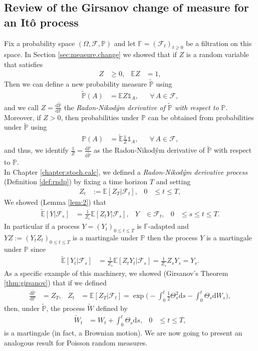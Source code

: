 \documentclass[12pt]{book}
\numberwithin{equation}{chapter}
\theoremstyle{plain}
\numberwithin{theorem}{section}
\theoremstyle{definition}
\numberwithin{exercise}{chapter}
\newcommand{\<}{\langle}
\renewcommand{\>}{\rangle}
\renewcommand{\(}{\left(}
\renewcommand{\)}{\right)}
\renewcommand{\[}{\left[}
\renewcommand{\]}{\right]}
\newcommand\Eb{\mathds{E}}
\newcommand\Fb{\mathds{F}}
\newcommand\Ib{\mathds{1}} 	%
\newcommand\Pb{\mathds{P}}
\newcommand\Fc{\mathscr{F}}
\newcommand\Om{\Omega}
\newcommand\Ebt{\widetilde{\Eb}}
\newcommand\Pbt{\widetilde{\Pb}}
\newcommand\Wt{\widetilde{W}}
\newcommand\dd{\mathrm{d}}
\begin{document}
\subsection*{Review of the Girsanov change of measure for an It\^o process}
Fix a probability space $(\Om,\Fc,\Pb)$ and let $\Fb=(\Fc_t)_{t \geq 0}$ be a filtration on this space.  In Section \ref{sec:measure.change} we showed that if $Z$ is a random variable that satisfies
\begin{align}
Z
	&\geq 0 , &
\Eb Z
	&=	1 ,
\end{align}
Then we can define a new probability measure $\Pbt$ using
\begin{align}
\Pbt(A)
	&=	\Eb Z \Ib_A , &
	&\forall \, A \in \Fc ,
\end{align}
and we call $Z = \frac{\dd \Pbt}{\dd \Pb}$ the \emph{Radon-Nikod\'ym derivative of $\Pbt$ with respect to $\Pb$}.  Moreover, if $Z>0$, then probabilities under $\Pb$ can be obtained from probabilities under $\Pbt$ using
\begin{align}
\Pb(A)
	&=	\Ebt \frac{1}{Z} \Ib_A , &
	&\forall \, A \in \Fc ,
\end{align}
and thus, we identify $\frac{1}{Z} = \frac{\dd \Pb}{\dd \Pbt}$ as the Radon-Nikod\'ym derivative of $\Pbt$ with respect to $\Pb$.
\\[0.5em]
In Chapter \ref{chapter:stoch.calc}, we defined a \emph{Radon-Nikod\'ym derivative process} (Definition \ref{def:rndp}) by fixing a time horizon $T$ and setting
\begin{align}
Z_t
	&:=	\Eb[ Z_T | \Fc_t ] , &
0
	&\leq t \leq T ,
\end{align}
We showed (Lemma \ref{lem:2}) that 
\begin{align}
\Ebt[ Y | \Fc_s ]
	&=	\frac{1}{Z_s} \Eb[ Z_t Y | \Fc_s ] , &
Y
	&\in \Fc_t , &
0
	&\leq s \leq t \leq T .
\end{align}
In particular if a process $Y = (Y_t)_{0 \leq t \leq T}$ is $\Fb$-adapted and $Y Z := (Y_t Z_t)_{0 \leq t \leq T}$ is a martingale under $\Pb$ then the process $Y$ is a martingale under $\Pb$ since
\begin{align}
\Ebt[ Y_t | \Fc_s ]
	&=	\frac{1}{Z_s} \Eb[ Z_t Y_t | \Fc_s ] 
	=	\frac{1}{Z_s} Z_s Y_s 
	=	Y_s . \label{eq:Etilde.martingale}
\end{align}
As a specific example of this machinery, we showed (Girsanov's Theorem \ref{thm:girsanov}) that if we defined
\begin{align}
\frac{\dd \Pbt}{\dd \Pb} 
	&= Z_T , &
Z_t
	&=	\Eb[Z_T| \Fc_t ] = \exp \Big( - \int_0^t \tfrac{1}{2} \Theta_s^2 \dd s - \int_0^t \Theta_s \dd W_s \Big) ,
\end{align}
then, under $\Pbt$, the process $\Wt$ defined by
\begin{align}
\Wt_t
	&=	W_t + \int_0^t \Theta_s \dd s , &
0
	&\leq t \leq T ,
\end{align}
is a martingale (in fact, a Brownian motion).  We are now going to present an analogous result for Poisson random measures.
\end{document}
